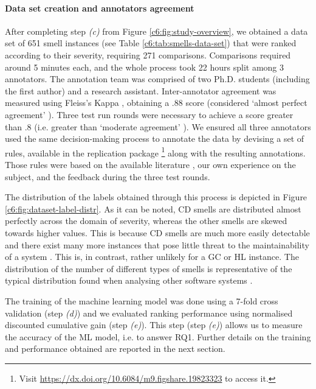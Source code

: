 \paragraph{Data set creation and annotators agreement}
After completing step \emph{(c)} from Figure \ref{c6:fig:study-overview}, we obtained a data set of 651 smell instances (see Table \ref{c6:tab:smells-data-set}) that were ranked according to their severity, requiring 271 comparisons.
Comparisons required around 5 minutes each, and the whole process took 22 hours split among 3 annotators.
The annotation team was comprised of two Ph.D. students (including the first author) and a research assistant.
Inter-annotator agreement was measured using Fleiss's Kappa \cite{Fleiss1971}, obtaining a $.88$ score (considered `almost perfect agreement' \cite{Fleiss1971}).
Three test run rounds were necessary to achieve a score greater than $.8$ (i.e. greater than `moderate agreement' \cite{Fleiss1971}). 
We ensured all three annotators used the same decision-making process to annotate the data by devising a set of rules, available in the replication package \footnote{Visit \url{https://dx.doi.org/10.6084/m9.figshare.19823323} to access it.} along with the resulting annotations.
Those rules were based on the available literature \cite{Laval2012,AlMutawa2014}, our own experience on the subject, and the feedback during the three test rounds.

The distribution of the labels obtained through this process is depicted in Figure \ref{c6:fig:dataset-label-distr}.
As it can be noted, CD smells are distributed almost perfectly across the domain of severity, whereas the other smells are skewed towards higher values.
This is because CD smells are much more easily detectable and there exist many more instances that pose little threat to the maintainability of a system \cite{AlMutawa2014,Laval2012}.
This is, in contrast, rather unlikely for a GC or HL instance.
The distribution of the number of different types of smells is representative of the typical distribution found when analysing other software systems \cite{Sas2021}.

The training of the machine learning model was done using a 7-fold cross validation (step \emph{(d)}) and we evaluated ranking performance using normalised discounted cumulative gain (step \emph{(e)}).
This step (step \emph{(e)}) allows us to measure the accuracy of the ML model, i.e. to answer RQ1.
Further details on the training and performance obtained are reported in the next section.

